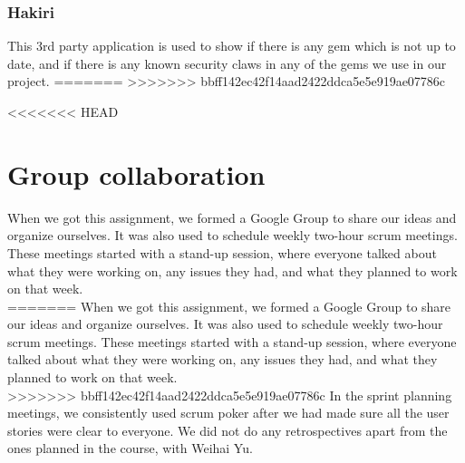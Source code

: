 \documentclass[a4paper]{article}
\begin{document}
\subsubsection{Hakiri}
This 3rd party application is used to show if there is any gem which is not up to date, and if there is any known security claws in any of the gems we use in our project.
=======
>>>>>>> bbff142ec42f14aad2422ddca5e5e919ae07786c

<<<<<<< HEAD

\section{Group collaboration}
When we got this assignment, we formed a Google Group to share our ideas and organize ourselves. It was also used to schedule weekly two-hour scrum meetings. These meetings started with a stand-up session, where everyone talked about what they were working on, any issues they had, and what they planned to work on that week.\\

=======
When we got this assignment, we formed a Google Group to share our ideas and organize ourselves. It was also used to schedule weekly two-hour scrum meetings. These meetings started with a stand-up session, where everyone talked about what they were working on, any issues they had, and what they planned to work on that week.\\

>>>>>>> bbff142ec42f14aad2422ddca5e5e919ae07786c
\noindent
In the sprint planning meetings, we consistently used scrum poker after we had made sure all the user stories were clear to everyone. We did not do any retrospectives apart from the ones planned in the course, with Weihai Yu.\\
\end{document}
